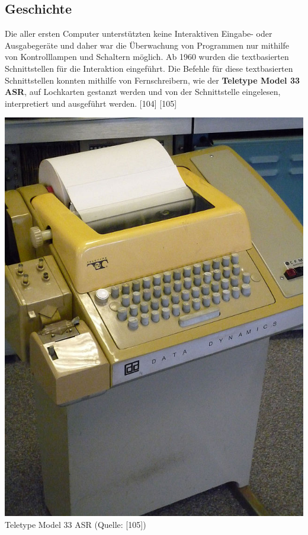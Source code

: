 \documentclass[12pt,a4paper]{report}
\begin{document}
\begin{onehalfspace}
\subsection{Geschichte}

Die aller ersten Computer unterstützten keine Interaktiven Eingabe- oder Ausgabegeräte und daher war die Überwachung von Programmen nur mithilfe von Kontrolllampen und Schaltern möglich. Ab 1960 wurden die textbasierten Schnittstellen für die Interaktion eingeführt. Die Befehle für diese textbasierten Schnittstellen konnten mithilfe von Fernschreibern, wie der \textbf{Teletype Model 33 ASR}, auf Lochkarten gestanzt werden und von der Schnittstelle eingelesen, interpretiert und ausgeführt werden. [104] [105]\\

\begin{center}
\includegraphics[scale=0.52]{img/teletype.jpg}\\
Teletype Model 33 ASR (Quelle: [105])
\end{center}


\end{onehalfspace}
\end{document}

